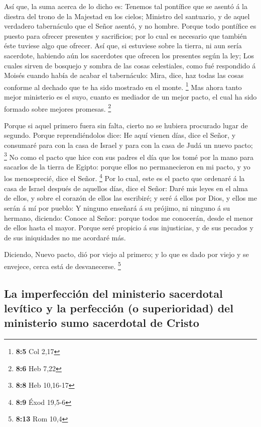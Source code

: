  Así que, la suma acerca de lo dicho es: Tenemos tal
pontífice que se asentó á la diestra del trono de la Majestad en los
cielos;  Ministro del santuario, y de aquel verdadero
tabernáculo que el Señor asentó, y no hombre.  Porque todo
pontífice es puesto para ofrecer presentes y sacrificios; por lo cual es
necesario que también éste tuviese algo que ofrecer.  Así
que, si estuviese sobre la tierra, ni aun sería sacerdote, habiendo aún
los sacerdotes que ofrecen los presentes según la ley;  Los
cuales sirven de bosquejo y sombra de las cosas celestiales, como fué
respondido á Moisés cuando había de acabar el tabernáculo: Mira, dice,
haz todas las cosas conforme al dechado que te ha sido mostrado en el
monte. \footnote{\textbf{8:5} Col 2,17}  Mas ahora tanto
mejor ministerio es el suyo, cuanto es mediador de un mejor pacto, el
cual ha sido formado sobre mejores promesas. \footnote{\textbf{8:6} Heb
  7,22}

 Porque si aquel primero fuera sin falta, cierto no se
hubiera procurado lugar de segundo.  Porque reprendiéndolos
dice: He aquí vienen días, dice el Señor, y consumaré para con la casa
de Israel y para con la casa de Judá un nuevo pacto; \footnote{\textbf{8:8}
  Heb 10,16-17}  No como el pacto que hice con sus padres el
día que los tomé por la mano para sacarlos de la tierra de Egipto:
porque ellos no permanecieron en mi pacto, y yo los menosprecié, dice el
Señor. \footnote{\textbf{8:9} Éxod 19,5-6}  Por lo cual,
este es el pacto que ordenaré á la casa de Israel después de aquellos
días, dice el Señor: Daré mis leyes en el alma de ellos, y sobre el
corazón de ellos las escribiré; y seré á ellos por Dios, y ellos me
serán á mí por pueblo:  Y ninguno enseñará á su prójimo, ni
ninguno á su hermano, diciendo: Conoce al Señor: porque todos me
conocerán, desde el menor de ellos hasta el mayor.  Porque
seré propicio á sus injusticias, y de sus pecados y de sus iniquidades
no me acordaré más.

 Diciendo, Nuevo pacto, dió por viejo al primero; y lo que
es dado por viejo y se envejece, cerca está de desvanecerse. \footnote{\textbf{8:13}
  Rom 10,4}

\hypertarget{la-imperfecciuxf3n-del-ministerio-sacerdotal-levuxedtico-y-la-perfecciuxf3n-o-superioridad-del-ministerio-sumo-sacerdotal-de-cristo}{%
\subsection{La imperfección del ministerio sacerdotal levítico y la
perfección (o superioridad) del ministerio sumo sacerdotal de
Cristo}\label{la-imperfecciuxf3n-del-ministerio-sacerdotal-levuxedtico-y-la-perfecciuxf3n-o-superioridad-del-ministerio-sumo-sacerdotal-de-cristo}}

